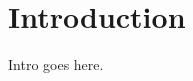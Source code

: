 \documentclass[Thesis.tex]{subfiles}
\begin{document}
\chapter{Introduction}
\label{chp:introduction}

Intro goes here.
\end{document}
